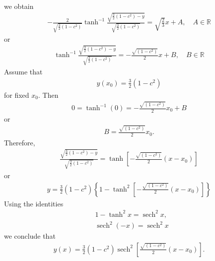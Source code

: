 \documentclass[12pt,reqno]{amsart}
\numberwithin{equation}{section}  %
\newcommand{\rr}{\mathbb{R}}
\def\sech{\operatorname{sech}}
\begin{document}
%
%
we obtain
%
%
\begin{equation*}
\begin{split}
  -\frac{2}{\sqrt{\frac{3}{2}(1-c^{2})}} \tanh^{-1}
  \frac{\sqrt{\frac{3}{2}(1-c^{2}) - y}}{\sqrt{\frac{3}{2}(1-c^{2})}} =
  \sqrt{\frac{2}{3}}x + A, \quad A \in \rr
\end{split}
\end{equation*}
%
%
or
\begin{equation*}
\begin{split}
  \tanh^{-1}
  \frac{\sqrt{\frac{3}{2}(1-c^{2}) - y}}{\sqrt{\frac{3}{2}(1-c^{2})}} =
  - \frac{\sqrt{(1-c^{2})}}{2}x + B, \quad B \in \rr
\end{split}
\end{equation*}
%
Assume that
%
%
\begin{equation*}
\begin{split}
  y(x_{0}) = \frac{3}{2}(1-c^{2})
\end{split}
\end{equation*}
%
%
for fixed $x_{0}$. Then
%
%
\begin{equation*}
\begin{split}
  0 = \tanh^{-1}(0) = - \frac{\sqrt{(1-c^{2})}}{2}x_{0} + B
\end{split}
\end{equation*}
%
%
or
%
%
\begin{equation*}
\begin{split}
B = \frac{\sqrt{(1-c^{2})}}{2}x_{0}.
\end{split}
\end{equation*}
%
%
Therefore,
%
%
\begin{equation*}
\begin{split}
  \frac{\sqrt{\frac{3}{2}(1-c^{2}) - y}}{\sqrt{\frac{3}{2}(1-c^{2})}} =
  \tanh \left [- \frac{\sqrt{(1-c^{2})}}{2}(x -x_{0}) \right ] 
\end{split}
\end{equation*}
%
%
or
%
%
%
\begin{equation*}
\begin{split}
  y = \frac{3}{2}(1-c^{2}) \left \{ 1 - \tanh^{2} \left [- \frac{\sqrt{(1-c^{2})}}{2}(x -x_{0})
  \right ] \right \}
  \end{split}
\end{equation*}
%
%
Using the identities
%
%
\begin{equation*}
\begin{split}
  & 1 - \tanh^{2}x = \sech^{2}x,
  \\
  & \sech^{2}(-x) = \sech^{2}x
\end{split}
\end{equation*}
%
we conclude that
%
%
\begin{equation*}
\begin{split}
  y(x) = \frac{3}{2}(1-c^{2}) \sech^{2} \left [\frac{\sqrt{(1-c^{2})}}{2}(x -x_{0})
  \right ]. 
  \end{split}
\end{equation*}
%
%
%
%
%
%
%
%
%
\end{document}
